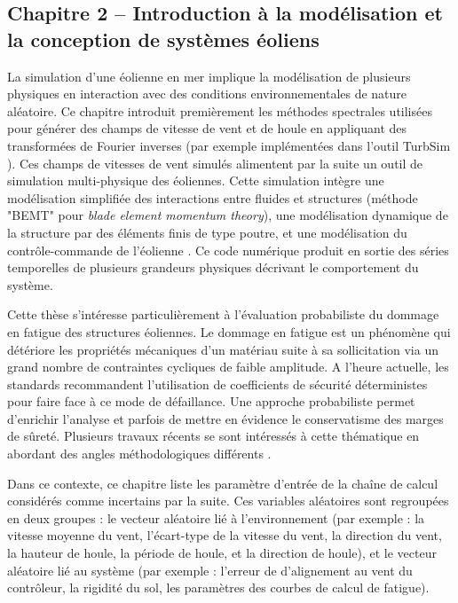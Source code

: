 \subsection*{Chapitre 2 -- Introduction à la modélisation et la conception de systèmes éoliens}

La simulation d'une éolienne en mer implique la modélisation de plusieurs physiques en interaction avec des conditions environnementales de nature aléatoire. 
Ce chapitre introduit premièrement les méthodes spectrales utilisées pour générer des champs de vitesse de vent et de houle en appliquant des transformées de Fourier inverses (par exemple implémentées dans l'outil TurbSim \cite{turbsim_2009}). 
Ces champs de vitesses de vent simulés alimentent par la suite un outil de simulation multi-physique des éoliennes. 
Cette simulation intègre une modélisation simplifiée des interactions entre fluides et structures (méthode "BEMT" pour \textit{blade element momentum theory}), une modélisation dynamique de la structure par des éléments finis de type poutre, et une modélisation du contrôle-commande de l'éolienne \cite{milano_thesis_2021}. 
Ce code numérique produit en sortie des séries temporelles de plusieurs grandeurs physiques décrivant le comportement du système.

Cette thèse s'intéresse particulièrement à l'évaluation probabiliste du dommage en fatigue des structures éoliennes. 
Le dommage en fatigue est un phénomène qui détériore les propriétés mécaniques d'un matériau suite à sa sollicitation via un grand nombre de contraintes cycliques de faible amplitude. 
A l'heure actuelle, les standards \cite{iec_2019,dnv_loads_2016} recommandent l'utilisation de coefficients de sécurité déterministes pour faire face à ce mode de défaillance. 
Une approche probabiliste permet d'enrichir l'analyse et parfois de mettre en évidence le conservatisme des marges de sûreté. 
Plusieurs travaux récents se sont intéressés à cette thématique en abordant des angles méthodologiques différents \cite{huchet_2019,lataniotis_2019,cousin_2021,hirvoas_2021,petrovska_2022}.

Dans ce contexte, ce chapitre liste les paramètre d'entrée de la chaîne de calcul considérés comme incertains par la suite. 
Ces variables aléatoires sont regroupées en deux groupes : le vecteur aléatoire lié à l'environnement (par exemple : la vitesse moyenne du vent, l'écart-type de la vitesse du vent, la direction du vent, la hauteur de houle, la période de houle, et la direction de houle), et le vecteur aléatoire lié au système (par exemple : l'erreur de d'alignement au vent du contrôleur, la rigidité du sol, les paramètres des courbes de calcul de fatigue).


